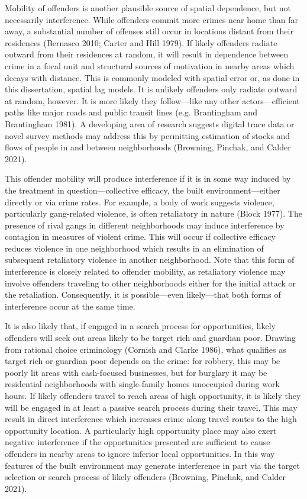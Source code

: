 \documentclass [11pt, proquest] {uwthesis}[2015/03/03]
\begin{document}
Mobility of offenders is another plausible source of spatial dependence, but not necessarily interference. While offenders commit more crimes near home than far away, a substantial number of offenses still occur in locations distant from their residences (Bernasco 2010; Carter and Hill 1979). If likely offenders radiate outward from their residences at random, it will result in dependence between crime in a focal unit and structural sources of motivation in nearby areas which decays with distance. This is commonly modeled with spatial error or, as done in this dissertation, spatial lag models. It is unlikely offenders only radiate outward at random, however. It is more likely they follow---like any other actors---efficient paths like major roads and public transit lines (e.g. Brantingham and Brantingham 1981). A developing area of research suggests digital trace data or novel survey methods may address this by permitting estimation of stocks and flows of people in and between neighborhoods (Browning, Pinchak, and Calder 2021).

This offender mobility will produce interference if it is in some way induced by the treatment in question---collective efficacy, the built environment---either directly or via crime rates. For example, a body of work suggests violence, particularly gang-related violence, is often retaliatory in nature (Block 1977). The presence of rival gangs in different neighborhoods may induce interference by contagion in measures of violent crime. This will occur if collective efficacy reduces violence in one neighborhood which results in an elimination of subsequent retaliatory violence in another neighborhood. Note that this form of interference is closely related to offender mobility, as retaliatory violence may involve offenders traveling to other neighborhoods either for the initial attack or the retaliation. Consequently, it is possible---even likely---that both forms of interference occur at the same time.

It is also likely that, if engaged in a search process for opportunities, likely offenders will seek out areas likely to be target rich and guardian poor. Drawing from rational choice criminology (Cornish and Clarke 1986), what qualifies as target rich or guardian poor depends on the crime: for robbery, this may be poorly lit areas with cash-focused businesses, but for burglary it may be residential neighborhoods with single-family homes unoccupied during work hours. If likely offenders travel to reach areas of high opportunity, it is likely they will be engaged in at least a passive search process during their travel. This may result in direct interference which increases crime along travel routes to the high opportunity location. A particularly high opportunity place may also exert negative interference if the opportunities presented are sufficient to cause offenders in nearby areas to ignore inferior local opportunities. In this way features of the built environment may generate interference in part via the target selection or search process of likely offenders (Browning, Pinchak, and Calder 2021).
\end{document}
